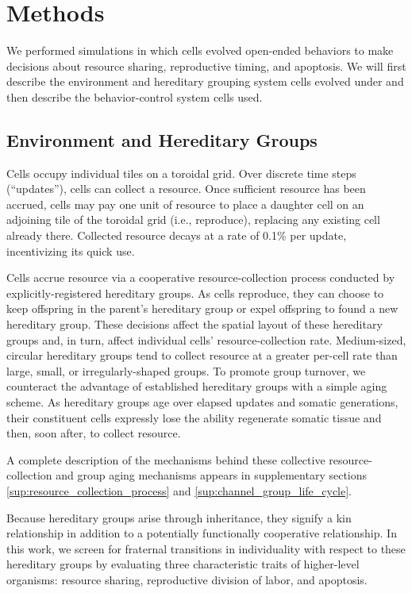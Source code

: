 \section{Methods}

We performed simulations in which cells evolved open-ended behaviors to make decisions about resource sharing, reproductive timing, and apoptosis.
We will first describe the environment and hereditary grouping system cells evolved under and then describe the behavior-control system cells used.

\subsection{Environment and Hereditary Groups}

Cells occupy individual tiles on a toroidal grid.
Over discrete time steps (``updates''), cells can collect a resource.
Once sufficient resource has been accrued, cells may pay one unit of resource to place a daughter cell on an adjoining tile of the toroidal grid (i.e., reproduce), replacing any existing cell already there.
Collected resource decays at a rate of 0.1\% per update, incentivizing its quick use.

Cells accrue resource via a cooperative resource-collection process conducted by explicitly-registered hereditary groups.
As cells reproduce, they can choose to keep offspring in the parent's hereditary group or expel offspring to found a new hereditary group.
These decisions affect the spatial layout of these hereditary groups and, in turn, affect individual cells' resource-collection rate.
Medium-sized, circular hereditary groups tend to collect resource at a greater per-cell rate than large, small, or irregularly-shaped groups.
To promote group turnover, we counteract the advantage of established hereditary groups with a simple aging scheme.
As hereditary groups age over elapsed updates and somatic generations, their constituent cells expressly lose the ability regenerate somatic tissue and then, soon after, to collect resource.

A complete description of the mechanisms behind these collective resource-collection and group aging mechanisms appears in supplementary sections \ref{sup:resource_collection_process} and \ref{sup:channel_group_life_cycle}.

Because hereditary groups arise through inheritance, they signify a kin relationship in addition to a potentially functionally cooperative relationship.
In this work, we screen for fraternal transitions in individuality with respect to these hereditary groups by evaluating three characteristic traits of higher-level organisms: resource sharing, reproductive division of labor, and apoptosis.

